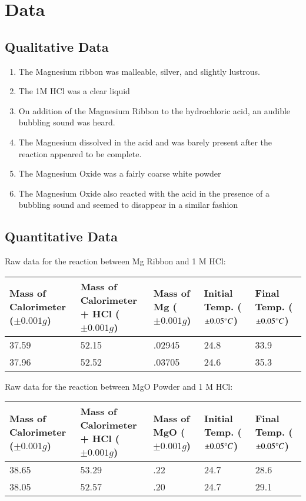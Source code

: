 \documentclass[12pt]{article}
\begin{document}
\section{Data}

\subsection{Qualitative Data}
	\begin{enumerate}
		\item The Magnesium ribbon was malleable, silver, and slightly lustrous.
		\item The 1M HCl was a clear liquid
		\item On addition of the Magnesium Ribbon to the hydrochloric acid, an audible bubbling sound was heard.
		\item The Magnesium dissolved in the acid and was barely present after the reaction appeared to be complete.
		\item The Magnesium Oxide was a fairly coarse white powder
		\item The Magnesium Oxide also reacted with the acid in the presence of a bubbling sound and seemed to disappear in a similar fashion
	\end{enumerate}

\subsection{Quantitative Data}
Raw data for the reaction between Mg Ribbon and 1 M HCl:

	\begin{center}
	\begin{tabular}{ |m{4cm}|m{4cm}|m{2cm}|m{2cm}|m{2cm}| }
	\hline
	Mass of Calorimeter ($\pm 0.001g$) & Mass of Calorimeter + HCl ($\pm 0.001g$) & Mass of Mg ($\pm 0.001g$) & Initial Temp. ($\pm 0.05 \degree C$) & Final Temp. ($\pm 0.05 \degree C$)\\
	\hline
	37.59 & 52.15 & .02945 & 24.8 & 33.9 \\
	37.96 & 52.52 & .03705 & 24.6 & 35.3 \\
	 \hline
	\end{tabular}
	\end{center}

\vspace{30mm}

Raw data for the reaction between MgO Powder and 1 M HCl:
	\begin{center}
	\begin{tabular}{ |m{4cm}|m{4cm}|m{2cm}|m{2cm}|m{2cm}| }
	\hline
	Mass of Calorimeter ($\pm 0.001g$) & Mass of Calorimeter + HCl ($\pm 0.001g$) & Mass of MgO ($\pm 0.001g$) & Initial Temp. ($\pm 0.05 \degree C$) & Final Temp. ($\pm 0.05 \degree C$)\\
	\hline
	38.65 & 53.29 & .22 & 24.7 & 28.6 \\
	38.05 & 52.57 & .20 & 24.7 & 29.1 \\
	 \hline
	\end{tabular}
	\end{center}
\end{document}
